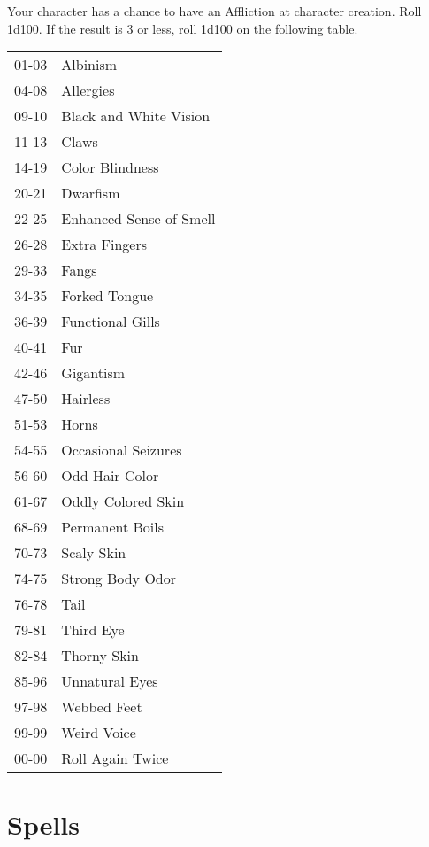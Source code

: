 \begin{multicols}{2}
Your character has a chance to have an Affliction at character creation. Roll
1d100. If the result is 3 or less, roll 1d100 on the following table.

\begin{center}
{
\begin{xtabular}{|l|l|}
01-03 & Albinism \\
04-08 & Allergies \\
09-10 & Black and White Vision \\
11-13 & Claws \\
14-19 & Color Blindness \\
20-21 & Dwarfism \\
22-25 & Enhanced Sense of Smell \\
26-28 & Extra Fingers \\
29-33 & Fangs \\
34-35 & Forked Tongue \\
36-39 & Functional Gills \\
40-41 & Fur \\
42-46 & Gigantism \\
47-50 & Hairless \\
51-53 & Horns \\
54-55 & Occasional Seizures \\
56-60 & Odd Hair Color \\
61-67 & Oddly Colored Skin \\
68-69 & Permanent Boils \\
70-73 & Scaly Skin \\
74-75 & Strong Body Odor \\
76-78 & Tail \\
79-81 & Third Eye \\
82-84 & Thorny Skin \\
85-96 & Unnatural Eyes \\
97-98 & Webbed Feet \\
99-99 & Weird Voice \\
00-00 & Roll Again Twice \\
\hline
\end{xtabular}
}
\end{center}

\section{Spells}


\end{multicols}
